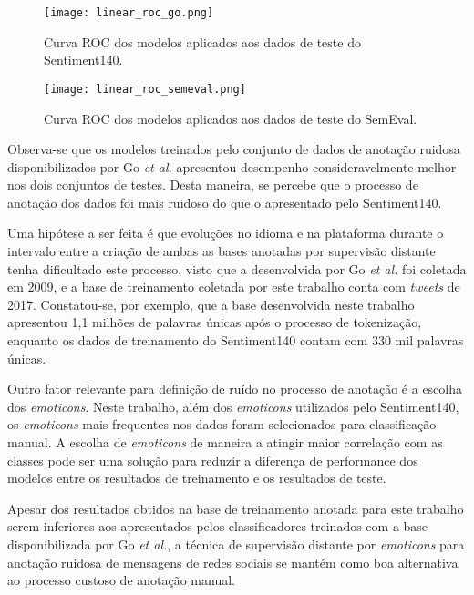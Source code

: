 \begin{figure}
\begin{center} {
    \begin{center}
    \texttt{[image: linear\_roc\_go.png]}
    \caption{Curva ROC dos modelos aplicados aos dados de teste do Sentiment140.}
    \label{fig:linear_roc_go}
    \end{center}
}
\end{center}
\end{figure}

\begin{figure}
\begin{center} {
    \begin{center}
    \texttt{[image: linear\_roc\_semeval.png]}
    \caption{Curva ROC dos modelos aplicados aos dados de teste do SemEval.}
    \label{fig:linear_roc_semeval}
    \end{center}
}
\end{center}
\end{figure}

Observa-se que os modelos treinados pelo conjunto de dados de anotação ruidosa disponibilizados por Go
\textit{et al.} apresentou desempenho consideravelmente melhor nos dois conjuntos de testes.
Desta maneira, se percebe que o processo de anotação dos dados foi mais ruidoso do que o apresentado pelo Sentiment140.

Uma hipótese a ser feita é que evoluções no idioma e na plataforma durante o intervalo entre a criação de ambas as
bases anotadas por supervisão distante tenha dificultado este processo, visto que a desenvolvida por Go \textit{et al.}
foi coletada em 2009, e a base de treinamento coletada por este trabalho conta com \textit{tweets} de 2017.
Constatou-se, por exemplo, que a base desenvolvida neste trabalho apresentou 1,1 milhões de palavras únicas após o
processo de tokenização, enquanto os dados de treinamento do Sentiment140 contam com 330 mil palavras únicas.

Outro fator relevante para definição de ruído no processo de anotação é a escolha dos \textit{emoticons}.
Neste trabalho, além dos \textit{emoticons} utilizados pelo Sentiment140, os \textit{emoticons} mais frequentes nos
dados foram selecionados para classificação manual.
A escolha de \textit{emoticons} de maneira a atingir maior correlação com as classes pode ser uma solução para reduzir
a diferença de performance dos modelos entre os resultados de treinamento e os resultados de teste.

Apesar dos resultados obtidos na base de treinamento anotada para este trabalho serem inferiores aos apresentados pelos
classificadores treinados com a base disponibilizada por Go \textit{et al.}, a técnica de supervisão distante por
\textit{emoticons} para anotação ruidosa de mensagens de redes sociais se mantém como boa alternativa ao processo
custoso de anotação manual.

